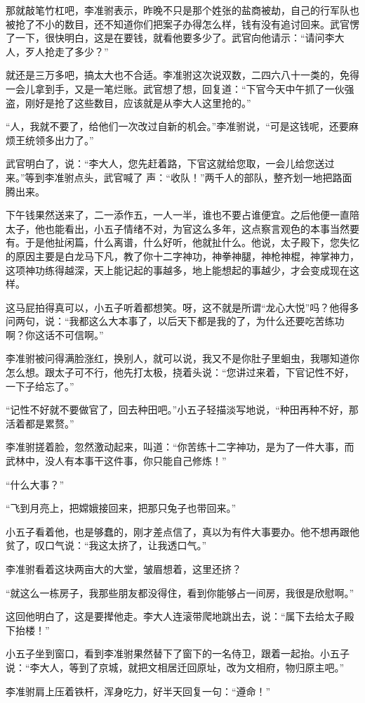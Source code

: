 那就敲笔竹杠吧，李准驸表示，昨晚不只是那个姓张的盐商被劫，自己的行军队也被抢了不小的数目，还不知道你们把案子办得怎么样，钱有没有追讨回来。武官愣了一下，很快明白，这是在要钱，就看他要多少了。武官向他请示：“请问李大人，歹人抢走了多少？”

就还是三万多吧，搞太大也不合适。李准驸这次说双数，二四六八十一类的，免得一会儿拿到手，又是一笔烂账。武官想了想，回复道：“下官今天中午抓了一伙强盗，刚好是抢了这些数目，应该就是从李大人这里抢的。”

“人，我就不要了，给他们一次改过自新的机会。”李准驸说，“可是这钱呢，还要麻烦王统领多出力了。”

武官明白了，说：“李大人，您先赶着路，下官这就给您取，一会儿给您送过来。”等到李准驸点头，武官喊了
声：“收队！”两千人的部队，整齐划一地把路面腾出来。

下午钱果然送来了，二一添作五，一人一半，谁也不要占谁便宜。之后他便一直陪太子，他也能看出，小五子情绪不对，为官这么多年，这点察言观色的本事当然要有。于是他扯闲篇，什么离谱，什么好听，他就扯什么。他说，太子殿下，您失忆的原因主要是白龙马下凡，教了你十二字神功，神拳神腿，神枪神棍，神掌神力，这项神功练得越深，天上能记起的事越多，地上能想起的事越少，才会变成现在这样。

这马屁拍得真可以，小五子听着都想笑。呀，这不就是所谓“龙心大悦”吗？他得多问两句，说：“我都这么大本事了，以后天下都是我的了，为什么还要吃苦练功啊？你这话不可信啊。”

李准驸被问得满脸涨红，换别人，就可以说，我又不是你肚子里蛔虫，我哪知道你怎么想。跟太子可不行，他先打太极，挠着头说：“您讲过来着，下官记性不好，一下子给忘了。”

“记性不好就不要做官了，回去种田吧。”小五子轻描淡写地说，“种田再种不好，那活着都是累赘。”

李准驸搓着脸，忽然激动起来，叫道：“你苦练十二字神功，是为了一件大事，而武林中，没人有本事干这件事，你只能自己修炼！”

“什么大事？”

“飞到月亮上，把嫦娥接回来，把那只兔子也带回来。”

小五子看着他，也是够蠢的，刚才差点信了，真以为有件大事要办。他不想再跟他贫了，叹口气说：“我这太挤了，让我透口气。”

李准驸看着这块两亩大的大堂，皱眉想着，这里还挤？

“就这么一栋房子，我那些朋友都没得住，看到你能够占一间房，我很是欣慰啊。”

这回他明白了，这是要撵他走。李大人连滚带爬地跳出去，说：“属下去给太子殿下抬楼！”

小五子坐到窗口，看到李准驸果然替下了窗下的一名侍卫，跟着一起抬。小五子说：“李大人，等到了京城，就把文相居迁回原址，改为文相府，物归原主吧。”

李准驸肩上压着铁杆，浑身吃力，好半天回复一句：“遵命！”

\newpage